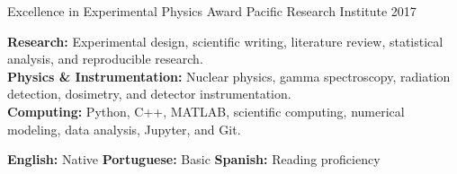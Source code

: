 \resumeentry
    {Excellence in Experimental Physics Award}
    {Pacific Research Institute}
    {2017}

\resumesection{\researchskillstitle}

\textbf{Research:} Experimental design, scientific writing, literature review, statistical analysis, and reproducible research. \\
\textbf{Physics \& Instrumentation:} Nuclear physics, gamma spectroscopy, radiation detection, dosimetry, and detector instrumentation. \\
\textbf{Computing:} Python, C++, MATLAB, scientific computing, numerical modeling, data analysis, Jupyter, and Git.

\resumesection{\languagestitle}

\textbf{English:} Native \quad
\textbf{Portuguese:} Basic \quad
\textbf{Spanish:} Reading proficiency
